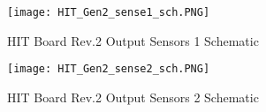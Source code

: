 \begin{figure}[hb]
\centering
\texttt{[image: HIT\_Gen2\_sense1\_sch.PNG]}
\caption{HIT Board Rev.2 Output Sensors 1 Schematic}
\label{Rev2 sense1 sch}
\end{figure}

\begin{figure}[ht]
\centering
\texttt{[image: HIT\_Gen2\_sense2\_sch.PNG]}
\caption{HIT Board Rev.2 Output Sensors 2 Schematic}
\label{Rev2 sense2 sch}
\end{figure}

